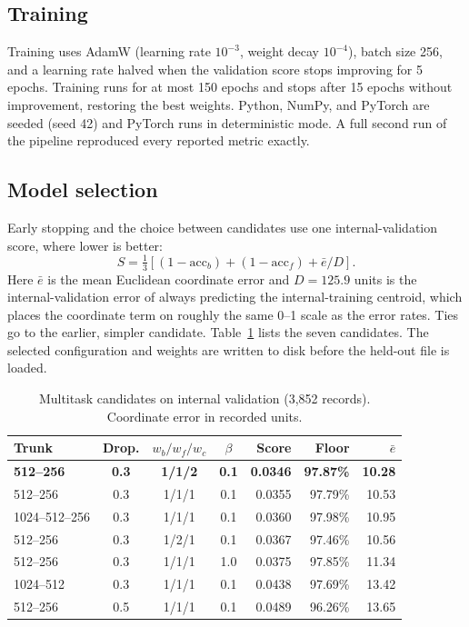 \documentclass[conference]{IEEEtran}
\begin{document}
\subsection{Training}
Training uses AdamW (learning rate $10^{-3}$, weight decay $10^{-4}$), batch size 256, and a learning rate halved when the validation score stops improving for 5 epochs. Training runs for at most 150 epochs and stops after 15 epochs without improvement, restoring the best weights. Python, NumPy, and PyTorch are seeded (seed 42) and PyTorch runs in deterministic mode. A full second run of the pipeline reproduced every reported metric exactly.

\subsection{Model selection}
Early stopping and the choice between candidates use one internal-validation score, where lower is better:
\[
S = \tfrac{1}{3}\left[(1-\mathrm{acc}_b) + (1-\mathrm{acc}_f) + \bar{e}/D\right].
\]
Here $\bar{e}$ is the mean Euclidean coordinate error and $D=125.9$ units is the internal-validation error of always predicting the internal-training centroid, which places the coordinate term on roughly the same 0--1 scale as the error rates. Ties go to the earlier, simpler candidate. Table~\ref{tab:selection} lists the seven candidates. The selected configuration and weights are written to disk before the held-out file is loaded.

\begin{table}[!t]
\centering
\caption{Multitask candidates on internal validation (3,852 records). Coordinate error in recorded units.}
\label{tab:selection}
\scriptsize
\setlength{\tabcolsep}{3pt}
\begin{tabular}{lcccrrr}
\toprule
Trunk & Drop. & $w_b/w_f/w_c$ & $\beta$ & Score & Floor & $\bar{e}$ \\
\midrule
\textbf{512--256} & \textbf{0.3} & \textbf{1/1/2} & \textbf{0.1} & \textbf{0.0346} & \textbf{97.87\%} & \textbf{10.28} \\
512--256 & 0.3 & 1/1/1 & 0.1 & 0.0355 & 97.79\% & 10.53 \\
1024--512--256 & 0.3 & 1/1/1 & 0.1 & 0.0360 & 97.98\% & 10.95 \\
512--256 & 0.3 & 1/2/1 & 0.1 & 0.0367 & 97.46\% & 10.56 \\
512--256 & 0.3 & 1/1/1 & 1.0 & 0.0375 & 97.85\% & 11.34 \\
1024--512 & 0.3 & 1/1/1 & 0.1 & 0.0438 & 97.69\% & 13.42 \\
512--256 & 0.5 & 1/1/1 & 0.1 & 0.0489 & 96.26\% & 13.65 \\
\bottomrule
\end{tabular}
\end{table}
\end{document}

